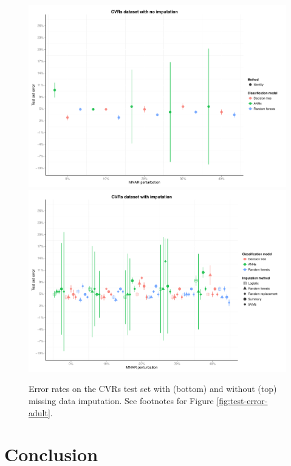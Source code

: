 \documentclass[10pt,twocolumn,letterpaper]{article}
\begin{document}
\begin{figure}[htbp] 
   \begin{center}
   \includegraphics[scale=0.5]{figure/test-errors-votes-no-imp.pdf}
      \includegraphics[scale=0.5]{figure/test-errors-votes-imp.pdf}
   \caption{Error rates on the CVRs test set with (bottom) and without (top) missing data imputation. See footnotes for Figure \ref{fig:test-error-adult}.}
   \label{fig:test-error-votes}
   \end{center}
\end{figure}

\section{Conclusion} \label{section:Con}
\end{document}
